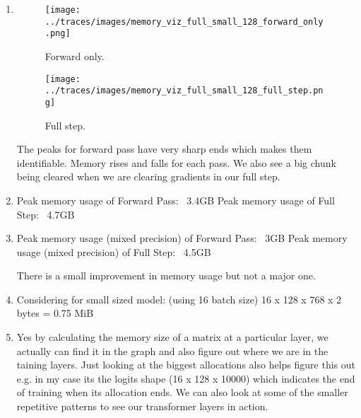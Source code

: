 \documentclass{article}
\begin{document}
\begin{enumerate}
\item
\begin{figure}[h]
    \centering
    \texttt{[image: ../traces/images/memory\_viz\_full\_small\_128\_forward\_only.png]}
    \caption{Forward only.}
\end{figure}
\begin{figure}[h]
    \centering
    \texttt{[image: ../traces/images/memory\_viz\_full\_small\_128\_full\_step.png]}
    \caption{Full step.}
\end{figure}

The peaks for forward pass have very sharp ends which makes them identifiable. Memory rises and falls for each pass. We also see a big chunk being cleared when we are clearing gradients in our full step.

\item
Peak memory usage of Forward Pass: ~3.4GB
Peak memory usage of Full Step: ~4.7GB

\item
Peak memory usage (mixed precision) of Forward Pass: ~3GB
Peak memory usage (mixed precision) of Full Step: ~4.5GB

There is a small improvement in memory usage but not a major one.

\item
Considering for small sized model: (using 16 batch size) 16 x 128 x 768 x 2 bytes = 0.75 MiB 

\item
Yes by calculating the memory size of a matrix at a particular layer, we actually can find it in the graph and also figure out where we are in the taining layers. Just looking at the biggest allocations also helps figure this out e.g. in my case its the logits shape (16 x 128 x 10000) which indicates the end of training when its allocation ends.
We can also look at some of the smaller repetitive patterns to see our transformer layers in action.
\end{enumerate}

\newpage
\end{document}
